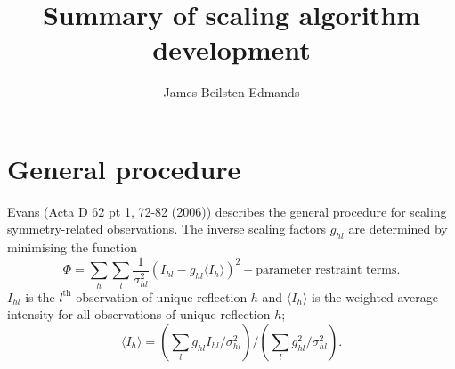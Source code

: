 \documentclass[11pt, oneside]{article}   	%
\title{Summary of scaling algorithm development}
\author{James Beilsten-Edmands}
\begin{document}
\maketitle

\section{General procedure}

Evans (Acta D 62 pt 1, 72-82 (2006)) describes the general procedure for scaling symmetry-related observations. The inverse scaling factors $g_{hl}$ are determined by minimising the function
\begin{equation}
\Phi = \sum_h \sum_l \frac{1}{\sigma^2_{hl}} (I_{hl} - g_{hl} \langle I_h \rangle)^2 + \text{parameter restraint terms}.
\end{equation}
$I_{hl}$ is the $l^{\text{th}}$ observation of unique reflection $h$ and $\langle I_h \rangle$ is the weighted average intensity for all observations of unique reflection $h$;
\begin{equation}
\langle I_h \rangle = (\sum_l g_{hl} I_{hl}/\sigma^2_{hl}) /  (\sum_l g^2_{hl} /\sigma^2_{hl}).
\end{equation}
\end{document}
